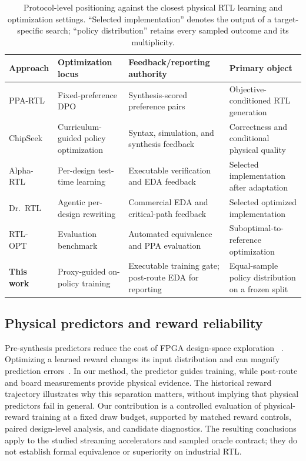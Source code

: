 \begin{table}[t]
\centering
\caption{Protocol-level positioning against the closest physical RTL learning
and optimization settings.  ``Selected implementation'' denotes the output of
a target-specific search; ``policy distribution'' retains every sampled
outcome and its multiplicity.}
\label{tab:positioning}
\small
\begin{tabularx}{\textwidth}{@{}lXXX@{}}
\toprule
Approach & Optimization locus & Feedback/reporting authority & Primary object \tabularnewline
\midrule
PPA-RTL~\cite{ppartl2025}
& Fixed-preference DPO
& Synthesis-scored preference pairs
& Objective-conditioned RTL generation \tabularnewline
ChipSeek~\cite{chipseek2025}
& Curriculum-guided policy optimization
& Syntax, simulation, and synthesis feedback
& Correctness and conditional physical quality \tabularnewline
Alpha-RTL~\cite{zhou2026alphartl}
& Per-design test-time learning
& Executable verification and EDA feedback
& Selected implementation after adaptation \tabularnewline
Dr.~RTL~\cite{drrtl2026}
& Agentic per-design rewriting
& Commercial EDA and critical-path feedback
& Selected optimized implementation \tabularnewline
RTL-OPT~\cite{lu2026rtlopt}
& Evaluation benchmark
& Automated equivalence and PPA evaluation
& Suboptimal-to-reference optimization \tabularnewline
\textbf{This work}
& Proxy-guided on-policy training
& Executable training gate; post-route EDA for reporting
& Equal-sample policy distribution on a frozen split \tabularnewline
\bottomrule
\end{tabularx}
\end{table}

\subsection{Physical predictors and reward reliability}

Pre-synthesis predictors reduce the cost of FPGA design-space exploration
~\cite{ustun2020accurate,wu2022highlevel,fang2024presynthesis}. Optimizing a
learned reward changes its input distribution and can magnify prediction
errors~\cite{gao2023scaling}. In our method, the predictor guides training,
while post-route and board measurements provide physical evidence. The
historical reward trajectory illustrates why this separation matters, without
implying that physical predictors fail in general. Our contribution is a
controlled evaluation of physical-reward training at a fixed draw budget,
supported by matched reward controls, paired design-level analysis, and
candidate diagnostics. The resulting conclusions apply to the studied
streaming accelerators and sampled oracle contract; they do not establish
formal equivalence or superiority on industrial RTL.
